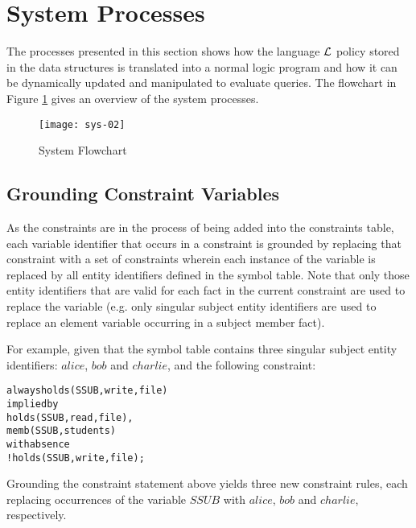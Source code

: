 \documentclass[11pt]{report}
\newenvironment{vverbatim}
{
  \begin{alltt}
}
{
    \vspace{-\baselineskip}
  \end{alltt}
}
\begin{document}
    \section{System Processes}
      \label{sect-polup-proce}

      The processes presented in this section shows how the language
      ${\cal L}$ policy stored in the data structures is translated into a
      normal logic program and how it can be dynamically updated and
      manipulated to evaluate queries. The flowchart in Figure
      \ref{figu-polup-sysfl} gives an overview of the system processes.

      \begin{figure}[tbhp]
        \begin{center}
          \texttt{[image: sys-02]}
          \caption{System Flowchart}
          \label{figu-polup-sysfl}
        \end{center}
      \end{figure}

      \subsection{Grounding Constraint Variables}
        \label{sect-polup-groun}

        As the constraints are in the process of being added into the
        constraints table, each variable identifier that occurs in a
        constraint is grounded by replacing that constraint with a set of
        constraints wherein each instance of the variable is replaced by all
        entity identifiers defined in the symbol table. Note that only those
        entity identifiers that are valid for each fact in the current
        constraint are used to replace the variable (e.g. only singular
        subject entity identifiers are used to replace an element variable
        occurring in a subject member fact).

        For example, given that the symbol table contains three singular
        subject entity identifiers: $alice$, $bob$ and $charlie$, and the
        following constraint:

        \begin{vverbatim}
  always holds(SSUB, write, file)
    implied by
      holds(SSUB, read, file),
      memb(SSUB, students)
    with absence
      !holds(SSUB, write, file);
        \end{vverbatim}

        Grounding the constraint statement above yields three new constraint
        rules, each replacing occurrences of the variable $SSUB$ with
        $alice$, $bob$ and $charlie$, respectively.
\end{document}
